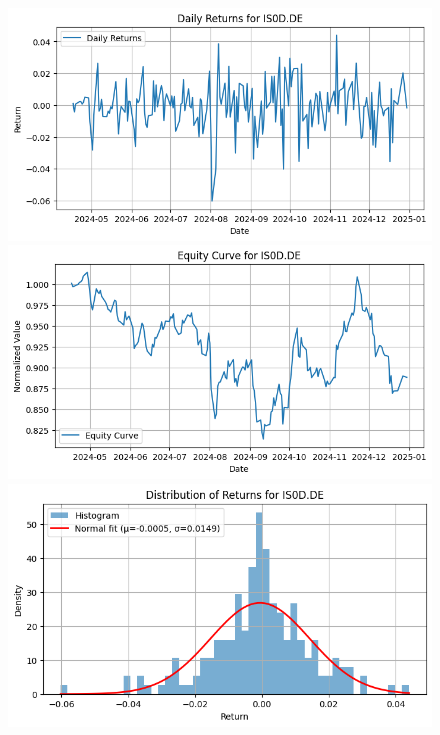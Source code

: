 \documentclass{article}%
\begin{document}
\begin{figure}[htbp]%
\begin{minipage}{0.31\textwidth}%
\includegraphics[width=\linewidth]{ticker_images/IS0D.DE_daily_returns.png}%
\end{minipage}%
\begin{minipage}{0.31\textwidth}%
\includegraphics[width=\linewidth]{ticker_images/IS0D.DE_equity_curve.png}%
\end{minipage}%
\begin{minipage}{0.31\textwidth}%
\includegraphics[width=\linewidth]{ticker_images/IS0D.DE_return_distribution.png}%
\end{minipage}%
\end{figure}
\end{document}
